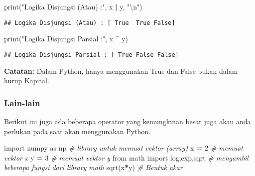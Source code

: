 \documentclass[
]{docs}
\newenvironment{Shaded}{\begin{snugshade}}{\end{snugshade}}
\newcommand{\BuiltInTok}[1]{#1}
\newcommand{\CharTok}[1]{\textcolor[rgb]{0.31,0.60,0.02}{#1}}
\newcommand{\CommentTok}[1]{\textcolor[rgb]{0.56,0.35,0.01}{\textit{#1}}}
\newcommand{\DecValTok}[1]{\textcolor[rgb]{0.00,0.00,0.81}{#1}}
\newcommand{\ImportTok}[1]{#1}
\newcommand{\NormalTok}[1]{#1}
\newcommand{\OperatorTok}[1]{\textcolor[rgb]{0.81,0.36,0.00}{\textbf{#1}}}
\newcommand{\StringTok}[1]{\textcolor[rgb]{0.31,0.60,0.02}{#1}}
\begin{document}
\begin{Shaded}
\begin{Highlighting}[]
\BuiltInTok{print}\NormalTok{(}\StringTok{"Logika Disjungsi (Atau) :"}\NormalTok{, x }\OperatorTok{|}\NormalTok{ y, }\StringTok{"}\CharTok{\textbackslash{}n}\StringTok{"}\NormalTok{)}
\end{Highlighting}
\end{Shaded}

\begin{verbatim}
## Logika Disjungsi (Atau) : [ True  True False]
\end{verbatim}

\begin{Shaded}
\begin{Highlighting}[]
\BuiltInTok{print}\NormalTok{(}\StringTok{"Logika Disjungsi Parsial :"}\NormalTok{, x }\OperatorTok{\^{}}\NormalTok{ y)}
\end{Highlighting}
\end{Shaded}

\begin{verbatim}
## Logika Disjungsi Parsial : [ True False False]
\end{verbatim}

\textbf{Catatan:} Dalam Python, hanya menggunakan True dan False bukan dalam hurup Kapital.

\hypertarget{lain-lain}{%
\subsubsection{Lain-lain}\label{lain-lain}}

Berikut ini juga ada beberapa operator yang kemungkinan besar juga akan anda perlukan pada saat akan menggunakan Python.

\begin{Shaded}
\begin{Highlighting}[]
\ImportTok{import}\NormalTok{ numpy }\ImportTok{as}\NormalTok{ np            }\CommentTok{\# library untuk memuat vektor (array)}
\NormalTok{x }\OperatorTok{=} \DecValTok{2}                         \CommentTok{\# memuat vektor x}
\NormalTok{y }\OperatorTok{=} \DecValTok{3}                         \CommentTok{\# memuat vektor y}
\ImportTok{from}\NormalTok{ math }\ImportTok{import}\NormalTok{ log,exp,sqrt }\CommentTok{\# mengambil beberapa fungsi dari library \textasciigrave{}math\textasciigrave{}}
\NormalTok{sqrt(x}\OperatorTok{*}\NormalTok{y)                     }\CommentTok{\# Bentuk akar}
\end{Highlighting}
\end{Shaded}
\end{document}
